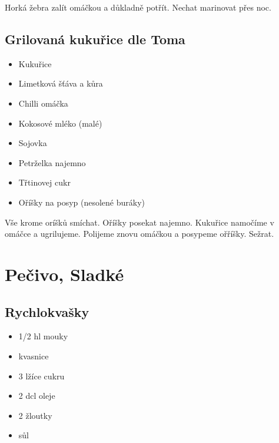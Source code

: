 \documentclass[10pt,a4paper]{article}
\newenvironment{myitemize}
{ \begin{itemize}
    \setlength{\itemsep}{0pt}
    \setlength{\parskip}{0pt}
    \setlength{\parsep}{0pt}     }
{ \end{itemize}                  }
\begin{document}
Horká žebra zalít omáčkou a důkladně potřít. Nechat marinovat přes noc.
\subsection{Grilovaná kukuřice dle Toma}
\begin{minipage}[t]{0,5\textwidth}
\begin{myitemize} 
\item Kukuřice
\item Limetková šťáva a kůra
\item Chilli omáčka
\item Kokosové mléko (malé)
\item Sojovka
\item Petrželka najemno
\item Třtinovej cukr
\item Oříšky na posyp (nesolené buráky) 
\end{myitemize}
\end{minipage}
\begin{minipage}[t]{0,5\textwidth}
Vše krome oríšků smíchat. Oříšky posekat najemno. Kukuřice namočíme v omáčce a ugrilujeme. Polijeme znovu omáčkou a posypeme ořříšky. Sežrat.
\end{minipage}
\pagebreak
\section{Pečivo, Sladké}
\subsection{Rychlokvašky}
\begin{minipage}[t]{0,5\textwidth}
\begin{myitemize} 
\item  1/2 hl mouky
\item kvasnice
\item 3 lžíce cukru
\item 2 dcl oleje
\item 2 žloutky
\item sůl
\end{myitemize}
\end{minipage}
\begin{minipage}[t]{0,5\textwidth}

\end{minipage}
\end{document}
